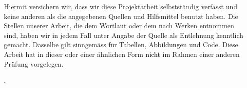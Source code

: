 
Hiermit versichern wir, dass wir diese Projektarbeit selbstständig verfasst und keine anderen als die angegebenen Quellen und Hilfsmittel benutzt haben. Die Stellen unserer Arbeit, die dem Wortlaut oder dem nach Werken entnommen sind, haben wir in jedem Fall unter Angabe der Quelle als Entlehnung kenntlich gemacht. Dasselbe gilt sinngemäss für Tabellen, Abbildungen und Code. Diese Arbeit hat in dieser oder einer ähnlichen Form nicht im Rahmen einer anderen Prüfung vorgelegen.

\vspace{12mm}

\noindent \closinglocation, \closingdate

\vspace{8mm}

\noindent \authorA \hfill \authorB \hfill 